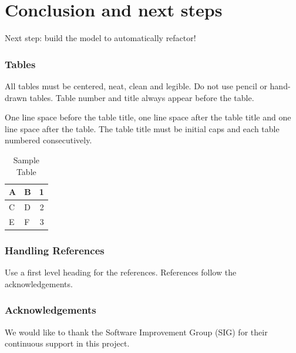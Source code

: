 \documentclass[a4paper]{article}
\begin{document}
\section{Conclusion and next steps}
Next step: build the model to automatically refactor!


\subsubsection{Tables}

All tables must be centered, neat, clean and legible. Do not use pencil
or hand-drawn tables. Table number and title always appear before the
table.

One line space before the table title, one line space after the table
title and one line space after the table. The table title must be
initial caps and each table numbered consecutively.

\begin{table}[ht]
\begin{center}
\caption{Sample Table}

\bigskip

\begin{tabular}{|l|l|r|}
\hline
A & B & 1\\ \hline
C & D & 2\\
E & F & 3\\ \hline
\end{tabular}
\end{center}
\end{table}


\subsubsection{Handling References}

Use a first level heading for the references. References follow the
acknowledgements.


\subsubsection{Acknowledgements}
We would like to thank the Software Improvement Group (SIG) for their continuous support in this project.






\end{document}
